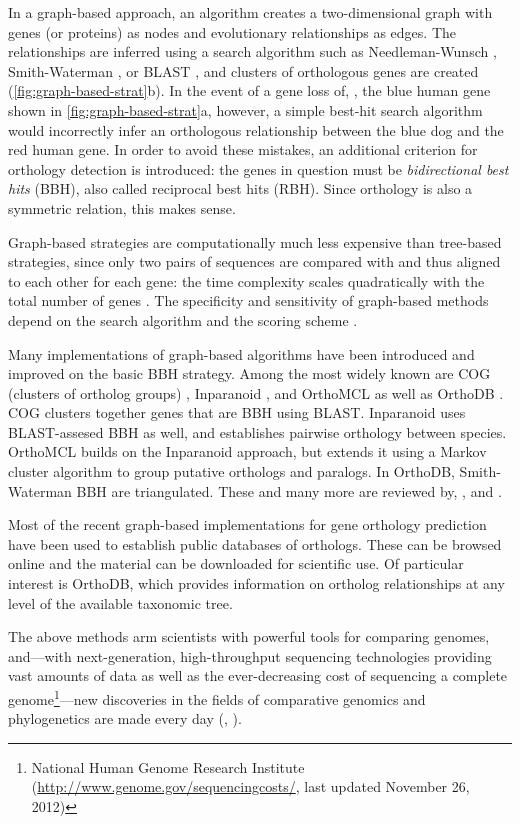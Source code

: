 In a graph-based approach, an algorithm creates a two-dimensional graph with
genes (or proteins) as nodes and evolutionary relationships as edges. The
relationships are inferred using a search algorithm such as Needleman-Wunsch
\citeyearpar{needleman1970}, Smith-Waterman \citeyearpar{smith1981}, or BLAST
\citep{altschul1990}, and clusters of orthologous genes are created
(\autoref{fig:graph-based-strat}b). In the event of a gene loss of, \eg, the
blue human gene shown in \autoref{fig:graph-based-strat}a, however, a simple
best-hit search algorithm would incorrectly infer an orthologous relationship
between the blue dog and the red human gene. In order to avoid these mistakes,
an additional criterion for orthology detection is introduced: the genes in
question must be \emph{bidirectional best hits} (BBH), also called reciprocal
best hits (RBH). Since orthology is also a symmetric relation, this makes sense.



Graph-based strategies are computationally much less expensive than tree-based
strategies, since only two pairs of sequences are compared with and thus aligned
to each other for each gene: the time complexity scales quadratically with the
total number of genes \citep{altenhoff2012-1}. The specificity and sensitivity
of graph-based methods depend on the search algorithm and the scoring scheme
\citep{hulsen2006}.

Many implementations of graph-based algorithms have been introduced and improved
on the basic BBH strategy. Among the most widely known are COG (clusters of
ortholog groups) \citep{tatusov2003}, Inparanoid \citep{ostlund2010}, and
OrthoMCL \citep{li2003} as well as OrthoDB \citep{waterhouse2011}. COG clusters
together genes that are BBH using BLAST. Inparanoid uses BLAST-assesed BBH as
well, and establishes pairwise orthology between species. OrthoMCL builds on the
Inparanoid approach, but extends it using a Markov cluster algorithm to group
putative orthologs and paralogs. In OrthoDB, Smith-Waterman BBH are
triangulated. These and many more are reviewed by, \eg, \citet{kuzniar2008} and
\citet{forslund2011}.

Most of the recent graph-based implementations for gene orthology prediction
have been used to establish public databases of orthologs. These can be browsed
online and the material can be downloaded for scientific use. Of particular
interest is OrthoDB, which provides information on ortholog relationships at any
level of the available taxonomic tree. 

The above methods arm scientists with powerful tools for comparing genomes,
and---with next-generation, high-throughput sequencing technologies providing
vast amounts of data as well as the ever-decreasing cost of sequencing a
complete genome\footnote{National Human Genome Research Institute
(\url{http://www.genome.gov/sequencingcosts/}, last updated November 26,
2012)}---new discoveries in the fields of comparative genomics and phylogenetics
are made every day (\eg, \citet{niehuis2012, bradbury2012}).

